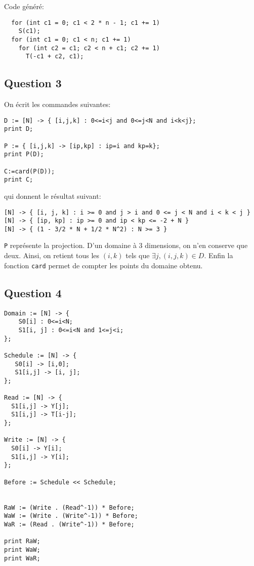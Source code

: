 \documentclass{article}
\begin{document}
Code généré:
\begin{lstlisting}
  for (int c1 = 0; c1 < 2 * n - 1; c1 += 1)
    S(c1);
  for (int c1 = 0; c1 < n; c1 += 1)
    for (int c2 = c1; c2 < n + c1; c2 += 1)
      T(-c1 + c2, c1);
\end{lstlisting}

\subsection*{Question 3}

On écrit les commandes suivantes:
\begin{lstlisting}
D := [N] -> { [i,j,k] : 0<=i<j and 0<=j<N and i<k<j};
print D;

P := { [i,j,k] -> [ip,kp] : ip=i and kp=k};
print P(D);

C:=card(P(D));
print C;
\end{lstlisting}

qui donnent le résultat suivant:
\begin{lstlisting}
[N] -> { [i, j, k] : i >= 0 and j > i and 0 <= j < N and i < k < j }
[N] -> { [ip, kp] : ip >= 0 and ip < kp <= -2 + N }
[N] -> { (1 - 3/2 * N + 1/2 * N^2) : N >= 3 }
\end{lstlisting}

\lstinline{P} représente la projection.
D'un domaine à 3 dimensions, on n'en conserve que deux.
Ainsi, on retient tous les $(i,k)$ tels que $\exists j, (i,j,k)\in D$.
Enfin la fonction \lstinline{card} permet de compter les points du domaine obtenu.

\subsection*{Question 4}

\begin{lstlisting}
Domain := [N] -> {
    S0[i] : 0<=i<N;
    S1[i, j] : 0<=i<N and 1<=j<i;
};

Schedule := [N] -> {
   S0[i] -> [i,0];
   S1[i,j] -> [i, j];
};

Read := [N] -> {
  S1[i,j] -> Y[j];
  S1[i,j] -> T[i-j];
};

Write := [N] -> {
  S0[i] -> Y[i];
  S1[i,j] -> Y[i];
};

Before := Schedule << Schedule;


RaW := (Write . (Read^-1)) * Before;
WaW := (Write . (Write^-1)) * Before;
WaR := (Read . (Write^-1)) * Before;

print RaW;
print WaW;
print WaR;
\end{lstlisting}
\end{document}
